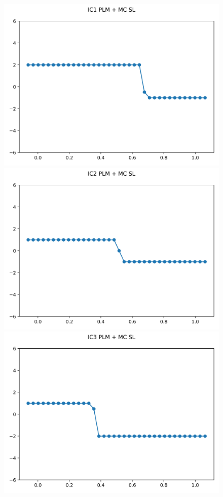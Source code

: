 \documentclass{article}
\begin{document}
\begin{figure}[t]
    \emp
        \centering
        \includegraphics[width=.95\textwidth]{../../code/unsafe_IC1Methodpo_plot.png}
        \includegraphics[width=.95\textwidth]{../../code/unsafe_IC2Methodpo_plot.png}
        \includegraphics[width=.95\textwidth]{../../code/unsafe_IC3Methodpo_plot.png}

\end{figure}
\end{document}
